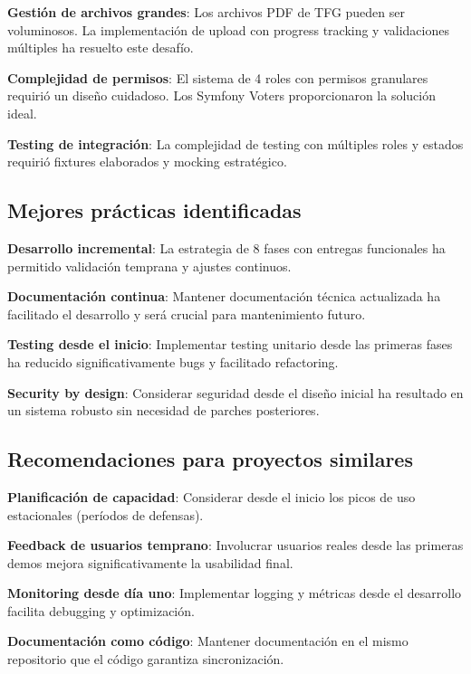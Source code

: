 \documentclass[12pt,a4paper,oneside]{report}
\begin{document}
{\textbf{Gestión de archivos grandes}: Los archivos PDF de TFG pueden ser
voluminosos. La implementación de upload con progress tracking y
validaciones múltiples ha resuelto este desafío.

\textbf{Complejidad de permisos}: El sistema de 4 roles con permisos
granulares requirió un diseño cuidadoso. Los Symfony Voters
proporcionaron la solución ideal.

\textbf{Testing de integración}: La complejidad de testing con múltiples
roles y estados requirió fixtures elaborados y mocking estratégico.

\subsection{Mejores prácticas
identificadas}\label{mejores-pruxe1cticas-identificadas}

\textbf{Desarrollo incremental}: La estrategia de 8 fases con entregas
funcionales ha permitido validación temprana y ajustes continuos.

\textbf{Documentación continua}: Mantener documentación técnica
actualizada ha facilitado el desarrollo y será crucial para
mantenimiento futuro.

\textbf{Testing desde el inicio}: Implementar testing unitario desde las
primeras fases ha reducido significativamente bugs y facilitado
refactoring.

\textbf{Security by design}: Considerar seguridad desde el diseño
inicial ha resultado en un sistema robusto sin necesidad de parches
posteriores.

\subsection{Recomendaciones para proyectos
similares}\label{recomendaciones-para-proyectos-similares}

\textbf{Planificación de capacidad}: Considerar desde el inicio los
picos de uso estacionales (períodos de defensas).

\textbf{Feedback de usuarios temprano}: Involucrar usuarios reales desde
las primeras demos mejora significativamente la usabilidad final.

\textbf{Monitoring desde día uno}: Implementar logging y métricas desde
el desarrollo facilita debugging y optimización.

\textbf{Documentación como código}: Mantener documentación en el mismo
repositorio que el código garantiza sincronización.

}
\end{document}
